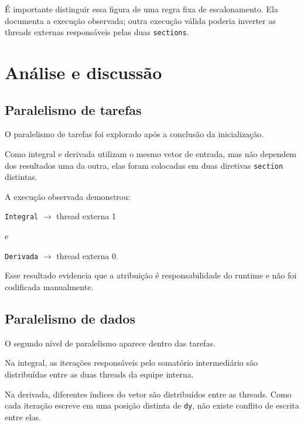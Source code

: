 É importante distinguir essa figura de uma regra fixa de escalonamento. Ela
documenta a execução observada; outra execução válida poderia inverter as
threads externas responsáveis pelas duas \texttt{sections}.


\section{Análise e discussão}
\label{sec:atvd08-discussao}

\subsection{Paralelismo de tarefas}

O paralelismo de tarefas foi explorado após a conclusão da inicialização.

Como integral e derivada utilizam o mesmo vetor de entrada, mas não dependem
dos resultados uma da outra, elas foram colocadas em duas diretivas
\texttt{section} distintas.

A execução observada demonstrou:

\begin{center}
\texttt{Integral} $\rightarrow$ thread externa 1
\end{center}

e

\begin{center}
\texttt{Derivada} $\rightarrow$ thread externa 0.
\end{center}

Esse resultado evidencia que a atribuição é responsabilidade do runtime e não
foi codificada manualmente.


\subsection{Paralelismo de dados}

O segundo nível de paralelismo aparece dentro das tarefas.

Na integral, as iterações responsáveis pelo somatório intermediário são
distribuídas entre as duas threads da equipe interna.

Na derivada, diferentes índices do vetor são distribuídos entre as threads.
Como cada iteração escreve em uma posição distinta de \texttt{dy}, não existe
conflito de escrita entre elas.

